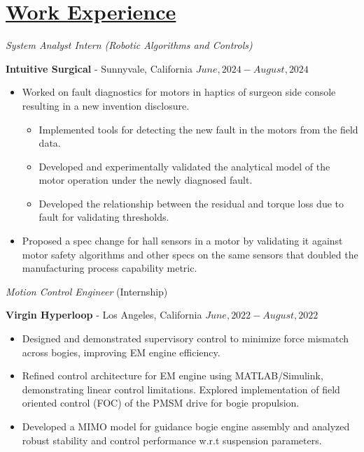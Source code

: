 \section*{\underline{Work Experience}}
\noindent \textit{System Analyst Intern (Robotic Algorithms and Controls)}

\textbf{Intuitive Surgical} - Sunnyvale, California \hfill $June, 2024  - August, 2024$

\begin{itemize}
        \item Worked on fault diagnostics for motors in haptics of surgeon side console resulting in a new invention disclosure.
        \begin{itemize}
                \item Implemented tools for detecting the new fault in the motors from the field data.
                \item Developed and experimentally validated the analytical model of the motor operation under the newly diagnosed fault.
                \item Developed the relationship between the residual and torque loss due to fault for validating thresholds.
        \end{itemize}
        \item Proposed a spec change for hall sensors in a motor by validating it against motor safety algorithms and other specs on the same sensors that doubled the manufacturing process capability metric.
\end{itemize}

\medskip


\noindent \textit{Motion Control Engineer } (Internship)

\textbf{Virgin Hyperloop} - Los Angeles, California \hfill $June, 2022  - August, 2022$

\begin{itemize}
        \item Designed and demonstrated supervisory control to minimize force mismatch across bogies, improving EM engine efficiency.
        \item Refined control architecture for EM engine using MATLAB/Simulink, demonstrating linear control limitations. Explored implementation of field oriented control (FOC) of the PMSM drive for bogie propulsion.
        \item Developed a MIMO model for guidance bogie engine assembly and analyzed robust stability and control performance w.r.t suspension parameters.
\end{itemize}

